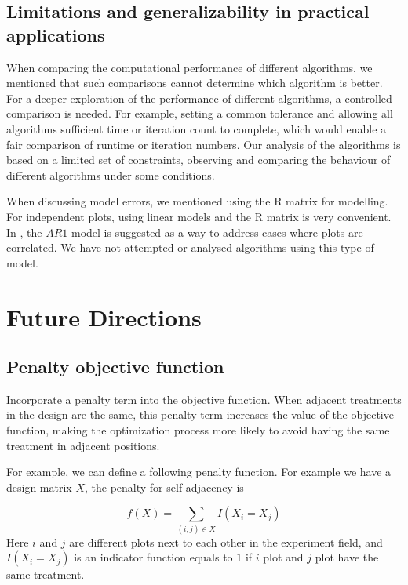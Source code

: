 \documentclass[
  a4paper,
  oneside,
  openany,
  12pt,
  onecolumn]{book}
\theoremstyle{definition}
\theoremstyle{plain}
\theoremstyle{remark}
\begin{document}
\subsection{Limitations and generalizability in practical
applications}\label{limitations-and-generalizability-in-practical-applications}

When comparing the computational performance of different algorithms, we
mentioned that such comparisons cannot determine which algorithm is
better. For a deeper exploration of the performance of different
algorithms, a controlled comparison is needed. For example, setting a
common tolerance and allowing all algorithms sufficient time or
iteration count to complete, which would enable a fair comparison of
runtime or iteration numbers. Our analysis of the algorithms is based on
a limited set of constraints, observing and comparing the behaviour of
different algorithms under some conditions.

When discussing model errors, we mentioned using the R matrix for
modelling. For independent plots, using linear models and the R matrix
is very convenient. In \citet{piepho2018neighbor}, the \({AR1}\) model
is suggested as a way to address cases where plots are correlated. We
have not attempted or analysed algorithms using this type of model.

\section{Future Directions}\label{future-directions}

\subsection{Penalty objective
function}\label{penalty-objective-function}

Incorporate a penalty term into the objective function. When adjacent
treatments in the design are the same, this penalty term increases the
value of the objective function, making the optimization process more
likely to avoid having the same treatment in adjacent positions.

For example, we can define a following penalty function. For example we
have a design matrix \(X\), the penalty for self-adjacency is

\[
f(X) = \sum_{(i,j)\in X}I(X_i = X_j)
\] Here \(i\) and \(j\) are different plots next to each other in the
experiment field, and \(I(X_i = X_j)\) is an indicator function equals
to \(1\) if \(i\) plot and \(j\) plot have the same treatment.
\end{document}
